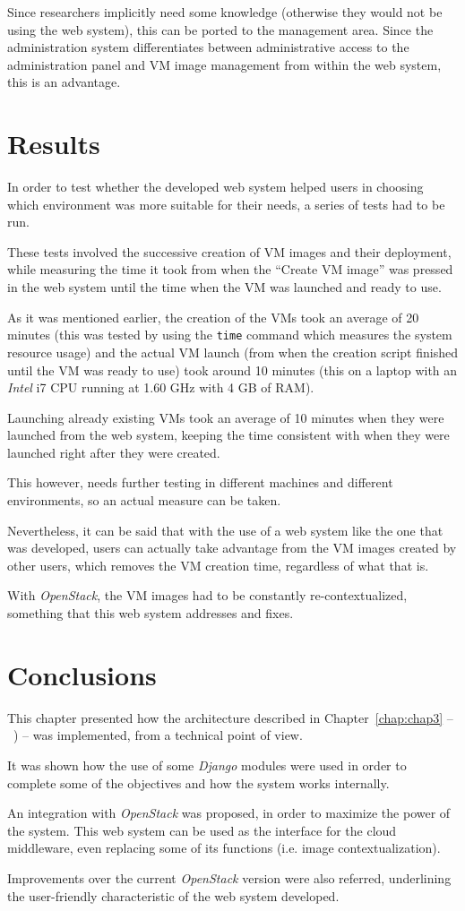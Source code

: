 Since researchers implicitly need some knowledge (otherwise they would not be using the web system), this can be ported to the management area. Since the administration system differentiates between administrative access to the administration panel and VM image management from within the web system, this is an advantage.

\section{Results}\label{sec:results}

In order to test whether the developed web system helped users in choosing which environment was more suitable for their needs, a series of tests had to be run.

These tests involved the successive creation of VM images and their deployment, while measuring the time it took from when the ``Create VM image'' was pressed in the web system until the time when the VM was launched and ready to use.

As it was mentioned earlier, the creation of the VMs took an average of 20 minutes (this was tested by using the \texttt{time} command which measures the system resource usage) and the actual VM launch (from when the creation script finished until the VM was ready to use) took around 10 minutes (this on a laptop with an \textit{Intel} i7 CPU running at 1.60 GHz with 4 GB of RAM).

Launching already existing VMs took an average of 10 minutes when they were launched from the web system, keeping the time consistent with when they were launched right after they were created.

This however, needs further testing in different machines and different environments, so an actual measure can be taken.

Nevertheless, it can be said that with the use of a web system like the one that was developed, users can actually take advantage from the VM images created by other users, which removes the VM creation time, regardless of what that is.

With \textit{OpenStack}, the VM images had to be constantly re-contextualized, something that this web system addresses and fixes.

\section{Conclusions}

This chapter presented how the architecture described in Chapter~\ref{chap:chap3} --~) -- was implemented, from a technical point of view. 

It was shown how the use of some \textit{Django} modules were used in order to complete some of the objectives and how the system works internally.

An integration with \textit{OpenStack} was proposed, in order to maximize the power of the system. This web system can be used as the interface for the cloud middleware, even replacing some of its functions (i.e. image contextualization).

Improvements over the current \textit{OpenStack} version were also referred, underlining the user-friendly characteristic of the web system developed.
